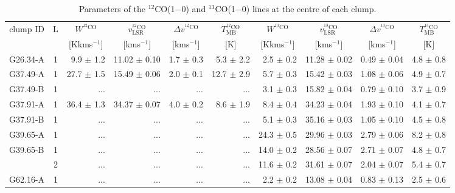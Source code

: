\documentclass[printer]{aa}
\begin{document}
\begin{table*}[h]
	\centering
	\footnotesize
	\caption{Parameters of the $^{12}$CO(1$-$0) and $^{13}$CO(1$-$0) lines at the centre of each clump.}
		\begin{tabular}{l c r r r r r r r r}
		\hline
\multicolumn{1}{c}{clump ID} & \multicolumn{1}{c}{L} & \multicolumn{1}{c}{$W\mathrm{^{^{12}CO}}$}& \multicolumn{1}{c}{$v\mathrm{_{LSR}^{^{12}CO}}$} & \multicolumn{1}{c}{$\Delta v\mathrm{^{^{12}CO}}$} & \multicolumn{1}{c}{$T\mathrm{_{MB}^{^{12}CO}}$} & \multicolumn{1}{c}{$W\mathrm{^{^{13}CO}}$}& \multicolumn{1}{c}{$v\mathrm{_{LSR}^{^{13}CO}}$} & \multicolumn{1}{c}{$\Delta v\mathrm{^{^{13}CO}}$} & \multicolumn{1}{c}{$T\mathrm{_{MB}^{^{13}CO}}$}  \\
	\multicolumn{1}{c}{\ } & \multicolumn{1}{c}{\ } & \multicolumn{1}{c}{[Kkms$^{-1}$]} & \multicolumn{1}{c}{[kms$^{-1}$]} & \multicolumn{1}{c}{[kms$^{-1}$]} & \multicolumn{1}{c}{[K]} & \multicolumn{1}{c}{[Kkms$^{-1}$]} & \multicolumn{1}{c}{[kms$^{-1}$]} & \multicolumn{1}{c}{[kms$^{-1}$]} & \multicolumn{1}{c}{[K]} \\
		\hline
		\hline
G26.34-A & 1 &   9.9 $\pm$ 1.2 &  11.02 $\pm$ 0.10 & 1.7 $\pm$ 0.3 &  5.3 $\pm$  2.2 &  2.5 $\pm$ 0.2 &  11.28 $\pm$ 0.02 & 0.49 $\pm$ 0.04 &  4.8 $\pm$ 0.8 \\
G37.49-A & 1 &  27.7 $\pm$ 1.5 &  15.49 $\pm$ 0.06 & 2.0 $\pm$ 0.1 & 12.7 $\pm$  2.9 &  5.7 $\pm$ 0.3 &  15.42 $\pm$ 0.03 & 1.08 $\pm$ 0.06 &  4.9 $\pm$ 0.7 \\
G37.49-B & 1 &   ... &   ... & ... &  ... &  3.1 $\pm$ 0.3 &  15.82 $\pm$ 0.04 & 0.79 $\pm$ 0.10 &  3.7 $\pm$ 0.9 \\
G37.91-A & 1 &  36.4 $\pm$ 1.3 &  34.37 $\pm$ 0.07 & 4.0 $\pm$ 0.2 &  8.6 $\pm$  1.9 &  8.4 $\pm$ 0.4 &  34.23 $\pm$ 0.04 & 1.93 $\pm$ 0.10 &  4.1 $\pm$ 0.7 \\
G37.91-B & 1 &   ... &   ... & ... &  ... &  5.1 $\pm$ 0.3 &  35.16 $\pm$ 0.03 & 1.05 $\pm$ 0.10 &  4.5 $\pm$ 0.8 \\
G39.65-A & 1 &   ... &   ... & ... &  ... & 24.3 $\pm$ 0.5 &  29.96 $\pm$ 0.03 & 2.79 $\pm$ 0.06 &  8.2 $\pm$ 0.8 \\
G39.65-B & 1 &   ... &   ... & ... &  ... & 14.0 $\pm$ 0.2 &  28.56 $\pm$ 0.07 & 2.71 $\pm$ 0.07 &  4.8 $\pm$ 0.7 \\
 & 2 &   ... &   ... & ... &  ... & 11.6 $\pm$ 0.2 &  31.61 $\pm$ 0.07 & 2.04 $\pm$ 0.07 &  5.4 $\pm$ 0.7 \\
G62.16-A & 1 &   ... &   ... & ... &  ... &  2.2 $\pm$ 0.2 &  13.08 $\pm$ 0.04 & 0.83 $\pm$ 0.13 &  2.5 $\pm$ 0.6 \\

\end{tabular}
\end{table*}
\end{document}
